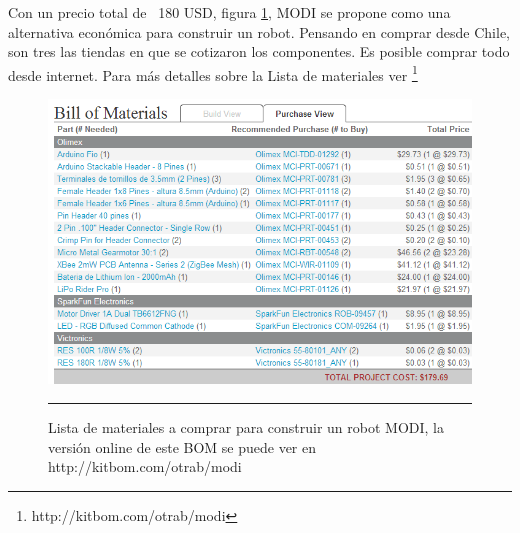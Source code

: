 Con un precio total de ~180 USD, figura \ref{fig:BOM}, MODI se propone como una alternativa económica para construir un robot. Pensando en comprar desde Chile, son tres las tiendas en que se cotizaron los componentes. Es posible comprar todo desde internet. Para más detalles sobre la Lista de materiales ver \footnote{http://kitbom.com/otrab/modi} 
\begin{figure}[htbp]
	\centering
		\includegraphics[width=\textwidth]{./Figures/MODI/kitbom.png}
		\rule{35em}{0.5pt}
	\caption[Bill Of Materials]{Lista de materiales a comprar para construir un robot MODI, la versión online de este BOM se puede ver en http://kitbom.com/otrab/modi}
	\label{fig:BOM}
\end{figure}
